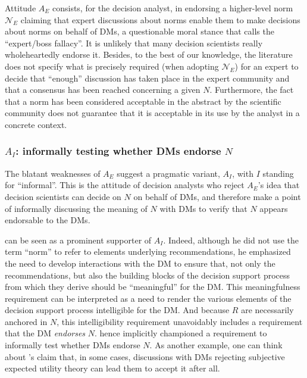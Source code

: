 \documentclass[preprint, french, english, 11pt, authoryear]{elsarticle}%
\newcommand{\protectforpdf}[1]{\texorpdfstring{\ensuremath{#1}}{#1}}
\newcommand{\possessivecite}[1]{\citeauthor{#1}’s \citeyearpar{#1}}
\begin{document}
Attitude $A_E$ consists, for the decision analyst, in endorsing a higher-level norm $\mathscr{N}_E$ claiming that expert discussions about norms enable them to make decisions about norms on behalf of \acp{DM}, a questionable moral stance that \citet{estlund_democratic_2009} calls the ``expert/boss fallacy''. 
It is unlikely that many decision scientists really wholeheartedly endorse it. 
Besides, to the best of our knowledge, the literature does not specify what is precisely required (when adopting  $\mathscr{N}_E$) for an expert to decide that “enough” discussion has taken place in the expert community and that a consensus has been reached concerning a given $N$. 
Furthermore, the fact that a norm has been considered acceptable in the abstract by the scientific community does not guarantee that it is acceptable in its use by the analyst in a concrete context.

\subsubsection{\texorpdfstring{$A_I$}{AI}: informally testing whether \texorpdfstring{\aclp{DM}}{\acp{DM}} endorse \protectforpdf{N}}
The blatant weaknesses of $A_E$ suggest a pragmatic variant, $A_I$, with $I$ standing for “informal”. 
This is the attitude of decision analysts who reject $A_E$'s idea that decision scientists can decide on $N$ on behalf of \acp{DM}, and therefore make a point of informally discussing the meaning of $N$ with \acp{DM} to verify that %
$N$ appears endorsable to the \acp{DM}.%

\citet{roy_multicriteria_1996} can be seen as a prominent supporter of $A_I$. 
Indeed, although he did not use the term “norm” to refer to elements underlying recommendations, he emphasized the need to develop interactions with the \ac{DM} to ensure that, not only the recommendations, 
but also the building blocks of the decision support process from which they derive should be ``meaningful'' for the \ac{DM}. This meaningfulness requirement can be interpreted as a need to render the various elements of the decision support process intelligible for the \ac{DM}.
And because $R$ are necessarily anchored in $N$, this intelligibility requirement unavoidably includes a requirement that the \ac{DM} \emph{endorses} $N$. 
\citet{roy_multicriteria_1996} hence implicitly championed a requirement to informally test whether \acp{DM} endorse $N$. 
As another example, one can think about \possessivecite{raiffa_back_1985} claim that, in some cases, discussions with \acp{DM} rejecting subjective expected utility theory can lead them to accept it after all.
\end{document}

